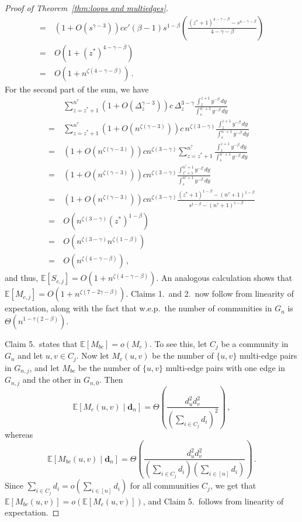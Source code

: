 \documentclass[12pt]{article}
\theoremstyle{definition}
\theoremstyle{remark}
\theoremstyle{remark}
\numberwithin{theorem}{section}
\newcommand{\E}[1]{{\mathbb E}\left[#1\right]}
\newcommand{\Cexp}[2]{\mathbb{E}\left[ \left. #1 \; \right| \; #2 \right]}
\begin{document}
\begin{proof}[Proof of Theorem~\ref{thm:loops and multiedges}]
\begin{align*}
= \ & 
\left(1 + O\left( s^{\gamma-3} \right) \right) cc' \left(\beta-1\right) s^{1-\beta} \left( \frac{\left(z^*+1\right)^{4-\gamma-\beta} - s^{4-\gamma-\beta}}{4-\gamma-\beta} \right) \\
= \ &
O\left(1 + (z^*)^{4-\gamma-\beta} \right) \\
= \ &
O\left(1 + n^{\zeta(4-\gamma-\beta)} \right) \,.
\end{align*}
For the second part of the sum, we have
\begin{align*}
& \sum_{z = z^*+1}^{n^\tau} \left(1 + O\left( \Delta_z^{\gamma-3} \right) \right) c \, \Delta_z^{3-\gamma} \frac{\int_z^{z+1} y^{-\beta} \, dy}{\int_s^{n^\tau + 1} y^{-\beta} \, dy}\\
= \ & \sum_{z = z^*+1}^{n^\tau} \left(1 + O\left( n^{\zeta(\gamma-3)} \right) \right) c \, n^{\zeta(3-\gamma)} \frac{\int_z^{z+1} y^{-\beta} \, dy}{\int_s^{n^\tau + 1} y^{-\beta} \, dy}\\
= \ &
\left(1 + O\left( n^{\zeta(\gamma-3)} \right) \right) c n^{\zeta(3-\gamma)} \sum_{z = z^*+1}^{n^\tau}  \frac{\int_z^{z+1} y^{-\beta} \, dy}{\int_s^{n^\tau + 1} y^{-\beta} \, dy}\\
= \ &
\left(1 + O\left( n^{\zeta(\gamma-3)} \right) \right) c n^{\zeta(3-\gamma)}  \frac{\int_{z^*+1}^{n^\tau+1} y^{-\beta} \, dy}{\int_s^{n^\tau + 1} y^{-\beta} \, dy}\\
= \ &
\left(1 + O\left( n^{\zeta(\gamma-3)} \right) \right) c n^{\zeta(3-\gamma)}  \frac{(z^*+1)^{1-\beta} - (n^\tau+1)^{1-\beta}}{s^{1-\beta} - (n^\tau+1)^{1-\beta}}\\
= \ & 
O\left( n^{\zeta(3-\gamma)} (z^*)^{1-\beta} \right)\\
= \ & 
O\left( n^{\zeta(3-\gamma)} n^{\zeta(1-\beta)} \right)\\
= \ & 
O\left( n^{\zeta(4-\gamma-\beta)} \right) \,,
\end{align*}
and thus, $\E{S_{c,j}} = O(1+n^{\zeta(4-\gamma-\beta)})$. An analogous calculation shows that $\E{M_{c,j}} = O(1+n^{\zeta(7-2\gamma-\beta)})$. Claims 1.\ and 2.\ now follow from linearity of expectation, along with the fact that w.e.p.\ the number of communities in $G_n$ is $\Theta(n^{1-\tau(2-\beta)})$. 

Claim 5.\ states that $\E{M_{bc}} = o(M_c)$. To see this, let $C_j$ be a community in $G_n$ and let $u,v \in C_j$. Now let $M_c(u,v)$ be the number of $\{u,v\}$ multi-edge pairs in $G_{n,j}$, and let $M_{bc}$ be the number of $\{u,v\}$ multi-edge pairs with one edge in $G_{n,j}$ and the other in $G_{n,0}$. Then 
\[
\Cexp{M_c(u,v)}{\textbf{d}_n} = \Theta\left( \frac{d_u^2 d_v^2}{\left(\sum_{i \in C_j} d_i \right)^2} \right) \,,
\]
whereas
\[
\Cexp{M_{bc}(u,v)}{\textbf{d}_n} = \Theta\left( \frac{d_u^2 d_v^2}{\left(\sum_{i \in C_j} d_i \right) \left(\sum_{i \in [n]} d_i \right)} \right) \,.
\]
Since $\sum_{i \in C_j} d_i = o\left( \sum_{i \in [n]} d_i \right)$ for all communities $C_j$, we get that $\E{M_{bc}(u,v)} = o\left( \E{M_{c}(u,v)} \right)$, and Claim 5.\ follows from linearity of expectation. 


\end{proof}
\end{document}
